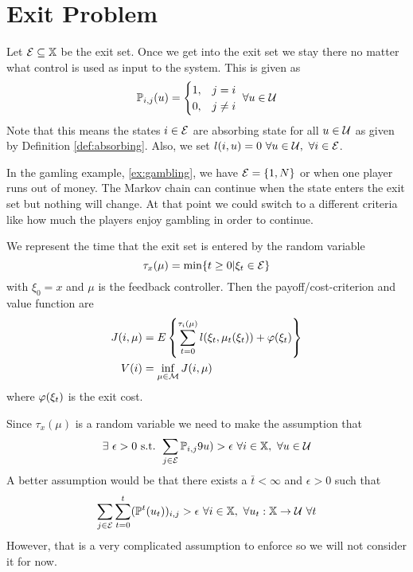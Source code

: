 
\mainmatter
\setcounter{page}{1}

\lectureseries[\course]{\course}

\date{November 5, 2009}

\setaddress

\setcounter{lecture}{11}
\setcounter{chapter}{11}


\section{Exit Problem}
Let $\mathcal{E}\subseteq\mathbb{X}$ be the exit set. Once we get into the exit set we stay there no matter what control is used as input to the system. This is given as
$$\mathbb{P}_{i,j}(u) = \begin{cases} 1, & j=i \\ 0, & j\neq i \end{cases} ~\forall u\in\mathcal{U}$$
Note that this means the states $i\in\mathcal{E}$ are absorbing state for all $u\in\mathcal{U}$ as given by Definition \ref{def:absorbing}. Also, we set $l(i,u)=0 ~\forall u\in\mathcal{U}, ~\forall i\in\mathcal{E}$.

In the gamling example, \ref{ex:gambling}, we have $\mathcal{E}=\{1,N\}$ or when one player runs out of money. The Markov chain can continue when the state enters the exit set but nothing will change. At that point we could switch to a different criteria like how much the players enjoy gambling in order to continue.

We represent the time that the exit set is entered by the random variable
$$\tau_x(\mu) = \min\{t\geq0 | \xi_t\in\mathcal{E}\}$$
with $\xi_0=x$ and $\mu$ is the feedback controller. Then the payoff/cost-criterion and value function are
\begin{align*}
J(i,\mu) &= E\left\lbrace\sum_{t=0}^{\tau_i(\mu)}l(\xi_t,\mu_t(\xi_t)) + \varphi(\xi_t)\right\rbrace \\
V(i) &= \inf_{\mu\in\mathcal{M}}J(i,\mu)
\end{align*}
where $\varphi(\xi_t)$ is the exit cost.

Since $\tau_x(\mu)$ is a random variable we need to make the assumption that
\begin{align}
\label{eq:tauassumption}
\exists~ \epsilon>0 \text{ s.t. } \sum_{j\in\mathcal{E}}\mathbb{P}_{i,j}9u)>\epsilon ~\forall i\in\mathbb{X}, ~\forall u\in\mathcal{U}
\end{align}
A better assumption would be that there exists a $\bar{t}<\infty$ and $\epsilon>0$ such that
$$\sum_{j\in\mathcal{E}}\sum_{t=0}^t(\mathbb{P}^t(u_t))_{i,j}>\epsilon ~\forall i\in\mathbb{X}, ~\forall u_t:\mathbb{X}\to\mathcal{U} ~\forall t$$
However, that is a very complicated assumption to enforce so we will not consider it for now.

